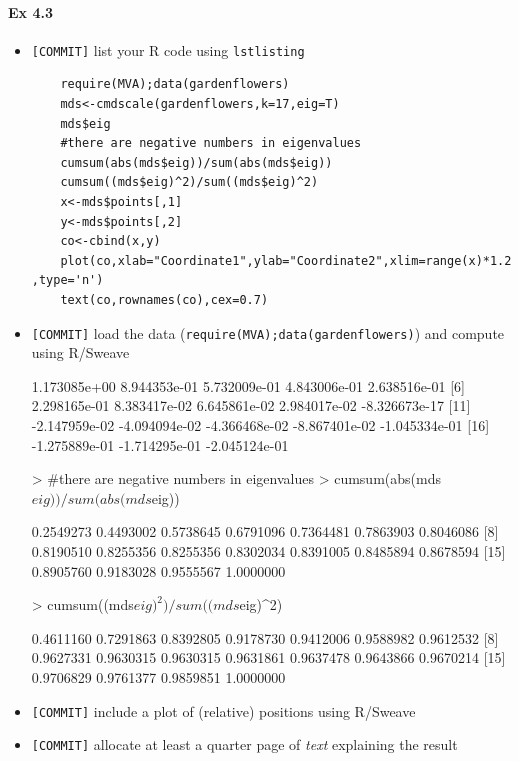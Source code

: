 \documentclass[12pt]{article}
\begin{document}
\paragraph{Ex 4.3}
\begin{itemize}
    \item \verb+[COMMIT]+ list your R code using \verb+lstlisting+ 
    \begin{lstlisting}
    require(MVA);data(gardenflowers)
    mds<-cmdscale(gardenflowers,k=17,eig=T)
    mds$eig
    #there are negative numbers in eigenvalues
    cumsum(abs(mds$eig))/sum(abs(mds$eig))
    cumsum((mds$eig)^2)/sum((mds$eig)^2)
    x<-mds$points[,1]
    y<-mds$points[,2]
    co<-cbind(x,y)
    plot(co,xlab="Coordinate1",ylab="Coordinate2",xlim=range(x)*1.2  ,type='n')
    text(co,rownames(co),cex=0.7)
    \end{lstlisting}
    \item \verb+[COMMIT]+ load the data
        (\verb+require(MVA);data(gardenflowers)+) and compute using R/Sweave
\begin{Schunk}
\begin{Soutput}
 [1]  1.173085e+00  8.944353e-01  5.732009e-01  4.843006e-01  2.638516e-01
 [6]  2.298165e-01  8.383417e-02  6.645861e-02  2.984017e-02 -8.326673e-17
[11] -2.147959e-02 -4.094094e-02 -4.366468e-02 -8.867401e-02 -1.045334e-01
[16] -1.275889e-01 -1.714295e-01 -2.045124e-01
\end{Soutput}
\begin{Sinput}
>     #there are negative numbers in eigenvalues
>     cumsum(abs(mds$eig))/sum(abs(mds$eig))
\end{Sinput}
\begin{Soutput}
 [1] 0.2549273 0.4493002 0.5738645 0.6791096 0.7364481 0.7863903 0.8046086
 [8] 0.8190510 0.8255356 0.8255356 0.8302034 0.8391005 0.8485894 0.8678594
[15] 0.8905760 0.9183028 0.9555567 1.0000000
\end{Soutput}
\begin{Sinput}
>     cumsum((mds$eig)^2)/sum((mds$eig)^2)
\end{Sinput}
\begin{Soutput}
 [1] 0.4611160 0.7291863 0.8392805 0.9178730 0.9412006 0.9588982 0.9612532
 [8] 0.9627331 0.9630315 0.9630315 0.9631861 0.9637478 0.9643866 0.9670214
[15] 0.9706829 0.9761377 0.9859851 1.0000000
\end{Soutput}
\end{Schunk}

    \item \verb+[COMMIT]+ include a plot of (relative) positions using R/Sweave
    \item \verb+[COMMIT]+ allocate at least a quarter page of \emph{text} explaining the result
\end{itemize}


\nocite{*}

\end{document}

